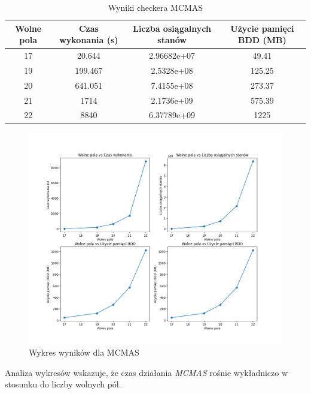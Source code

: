     \begin{table}[h!]
      \centering
      \begin{tabular}{|c|c|c|c|}
      \hline
      Wolne pola & Czas wykonania (s) & Liczba osiągalnych stanów & Użycie pamięci BDD (MB)  \\
      \hline
      17 &  20.644 & 2.96682e+07  & 49.41   \\
       19 & 199.467 &2.5328e+08 & 125.25 \\
       20& 641.051 &7.4155e+08 & 273.37 \\
       21 & 1714 &2.1736e+09 & 575.39 \\
       22 & 8840 & 6.37789e+09 & 1225\\ 
      \hline
      \end{tabular}
      \caption{Wyniki checkera MCMAS}
      \label{table:mcmas_results}
      \end{table}
      \begin{figure}[h]
        \centering
        \includegraphics[width=\linewidth]{figures/wykres_wyniki_mcmas_1.png}
        \caption{Wykres wyników dla MCMAS}
        \label{fig:enter-label}
    \end{figure}

Analiza wykresów wskazuje, że czas działania \textit{MCMAS} rośnie 
wykładniczo w stosunku do liczby wolnych pól. 
